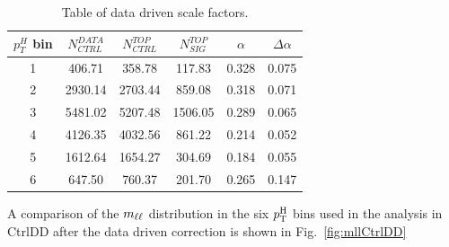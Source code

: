 




\begin{table}
\centering
\begin{tabular}{c c c c c c}

\hline\hline

$p_T^H$ bin & $N_{CTRL}^{DATA}$ & $N_{CTRL}^{TOP}$ &  $N_{SIG}^{TOP}$ &
$\alpha$ & $\Delta\alpha$ \\ 

\hline

1 & 406.71 & 358.78 & 117.83 & 0.328 & 0.075 \\ 

2 & 2930.14 & 2703.44 & 859.08 & 0.318 & 0.071 \\ 

3 & 5481.02 & 5207.48 & 1506.05 & 0.289 & 0.065 \\ 

4 & 4126.35 & 4032.56 & 861.22 & 0.214 & 0.052 \\ 

5 & 1612.64 & 1654.27 & 304.69 & 0.184 & 0.055 \\ 

6 & 647.50 & 760.37 & 201.70 & 0.265 & 0.147 \\ 

\hline

\end{tabular}
\caption{Table of data driven scale factors.\label{tab:ttdd}}
\end{table}
A comparison of the $m_{\ell\ell}$ distribution in the six $p_\mathrm{T}^\mathrm{H}$ bins used in the analysis in CtrlDD after the data driven correction is shown in Fig.~\ref{fig:mllCtrlDD}
